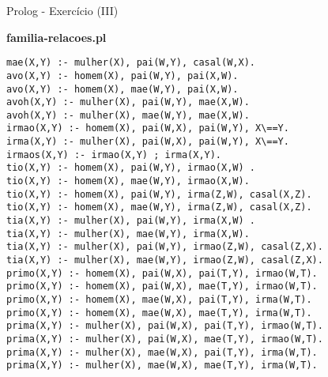 \begin{frame}[fragile]{Prolog - Exercício (III)}
	\begin{center}
	{\bf familia-relacoes.pl}
	\end{center}

\begin{minipage}{0.4\textwidth}
\begin{tiny}
\begin{lstlisting}
mae(X,Y) :- mulher(X), pai(W,Y), casal(W,X).
avo(X,Y) :- homem(X), pai(W,Y), pai(X,W).
avo(X,Y) :- homem(X), mae(W,Y), pai(X,W).
avoh(X,Y) :- mulher(X), pai(W,Y), mae(X,W).
avoh(X,Y) :- mulher(X), mae(W,Y), mae(X,W).
irmao(X,Y) :- homem(X), pai(W,X), pai(W,Y), X\==Y.
irma(X,Y) :- mulher(X), pai(W,X), pai(W,Y), X\==Y.
irmaos(X,Y) :- irmao(X,Y) ; irma(X,Y).
tio(X,Y) :- homem(X), pai(W,Y), irmao(X,W) .
tio(X,Y) :- homem(X), mae(W,Y), irmao(X,W).
tio(X,Y) :- homem(X), pai(W,Y), irma(Z,W), casal(X,Z).
tio(X,Y) :- homem(X), mae(W,Y), irma(Z,W), casal(X,Z).
tia(X,Y) :- mulher(X), pai(W,Y), irma(X,W) .
tia(X,Y) :- mulher(X), mae(W,Y), irma(X,W).
tia(X,Y) :- mulher(X), pai(W,Y), irmao(Z,W), casal(Z,X).
tia(X,Y) :- mulher(X), mae(W,Y), irmao(Z,W), casal(Z,X).
primo(X,Y) :- homem(X), pai(W,X), pai(T,Y), irmao(W,T).
primo(X,Y) :- homem(X), pai(W,X), mae(T,Y), irmao(W,T).
primo(X,Y) :- homem(X), mae(W,X), pai(T,Y), irma(W,T).
primo(X,Y) :- homem(X), mae(W,X), mae(T,Y), irma(W,T).
prima(X,Y) :- mulher(X), pai(W,X), pai(T,Y), irmao(W,T).
prima(X,Y) :- mulher(X), pai(W,X), mae(T,Y), irmao(W,T).
prima(X,Y) :- mulher(X), mae(W,X), pai(T,Y), irma(W,T).
prima(X,Y) :- mulher(X), mae(W,X), mae(T,Y), irma(W,T).
\end{lstlisting}
\end{tiny}
\end{minipage}
\end{frame}
